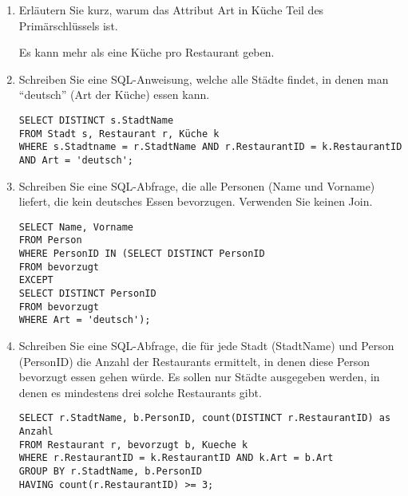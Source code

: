 \documentclass{bschlangaul-aufgabe}
\begin{document}
\begin{enumerate}


\item Erläutern Sie kurz, warum das Attribut Art in Küche Teil des
Primärschlüssels ist.

\begin{bAntwort}
Es kann mehr als eine Küche pro Restaurant geben.
\end{bAntwort}


\item Schreiben Sie eine SQL-Anweisung, welche alle Städte findet, in
denen man “deutsch” (Art der Küche) essen kann.

\begin{bAntwort}
\begin{verbatim}
SELECT DISTINCT s.StadtName
FROM Stadt s, Restaurant r, Küche k
WHERE s.Stadtname = r.StadtName AND r.RestaurantID = k.RestaurantID AND Art = 'deutsch';
\end{verbatim}
\end{bAntwort}


\item Schreiben Sie eine SQL-Abfrage, die alle Personen (Name und
Vorname) liefert, die kein deutsches Essen bevorzugen. Verwenden Sie
keinen Join.

\begin{bAntwort}
\begin{verbatim}
SELECT Name, Vorname
FROM Person
WHERE PersonID IN (SELECT DISTINCT PersonID
FROM bevorzugt
EXCEPT
SELECT DISTINCT PersonID
FROM bevorzugt
WHERE Art = 'deutsch');
\end{verbatim}
\end{bAntwort}


\item Schreiben Sie eine SQL-Abfrage, die für jede Stadt (StadtName) und
Person (PersonID) die Anzahl der Restaurants ermittelt, in denen diese
Person bevorzugt essen gehen würde. Es sollen nur Städte ausgegeben
werden, in denen es mindestens drei solche Restaurants gibt.

\begin{bAntwort}
\begin{verbatim}
SELECT r.StadtName, b.PersonID, count(DISTINCT r.RestaurantID) as Anzahl
FROM Restaurant r, bevorzugt b, Kueche k
WHERE r.RestaurantID = k.RestaurantID AND k.Art = b.Art
GROUP BY r.StadtName, b.PersonID
HAVING count(r.RestaurantID) >= 3;
\end{verbatim}
\end{bAntwort}


\end{enumerate}
\end{document}
